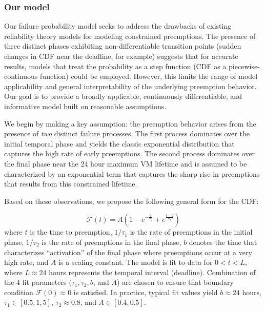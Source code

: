 \documentclass[sigconf]{acmart} %
\newcommand{\subsecspace}[0]{-0.20cm}
\begin{document}
\vspace*{\subsecspace}
\subsubsection{Our  model}
\label{subsec:preemption-model}

Our failure probability model seeks to address the drawbacks of existing reliability theory models for modeling constrained preemptions. 
The presence of three distinct phases exhibiting non-differentiable transition points (sudden changes in CDF near the deadline, for example) suggests that for accurate results, models that treat the probability as a step function (CDF as a piecewise-continuous function) could be employed.
However, this limits the range of model applicability and general interpretability of the underlying preemption behavior. Our goal is to provide a broadly applicable, continuously differentiable, and informative model built on reasonable assumptions.  

We begin by making a key assumption: the preemption behavior arises from the presence of \emph{two} distinct failure processes.
The first process dominates over the initial temporal phase and yields the classic exponential distribution that captures the high rate of early preemptions.
The second process dominates over the final phase near the 24 hour maximum VM lifetime and is assumed to be characterized by an exponential term that captures the sharp rise in preemptions that results from this constrained lifetime. 

Based on these observations, we propose the following general form for the CDF:

\vspace*{\subsecspace}
\begin{equation}
  \label{eq:blend1}
  \boxed{
  \mathscr{F}\left(t\right) = A\left(1-e^{-\frac{t}{\tau_1}} + e^{\frac{t-b}{\tau_2}}\right)}
  \end{equation}
\noindent where $t$ is the time to preemption, $1/\tau_1$ is the rate of preemptions in the initial phase, $1/\tau_2$ is the rate of preemptions in the final phase, $b$ denotes the time that characterizes ``activation'' of the final phase where preemptions occur at a very high rate, and $A$ is a scaling constant. 
The model is fit to data for $0 < t < L$, where $L \approx 24$ hours represents the temporal interval (deadline).
Combination of the 4 fit parameters ($\tau_1, \tau_2, b$, and $A$) are chosen to ensure that boundary condition $\mathscr{F}(0) \approx 0$ is satisfied.
In practice, typical fit values yield $b \approx 24$ hours, $\tau_1 \in [0.5, 1,5] $, $\tau_2 \approx 0.8$, and $A \in [0.4, 0.5]$.
\end{document}
